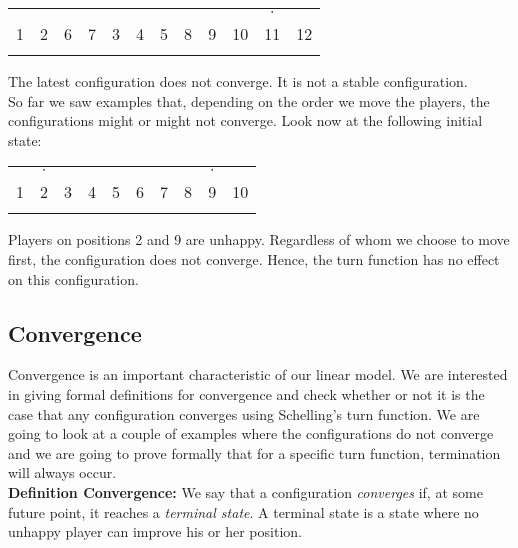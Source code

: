 \documentclass[../main.tex]{subfiles}
\begin{document}
\begin{table}[H]
\begin{center}
{\begin{tabular}{| c |c| c| c| c |c| c |c| c |c |c |c |}
\hline
 &&  & & &  & & & & &$\cdot$ & \\
1 & 2 &6 &7 &3 &4  &5 &8 &9 &10 &11 & 12 \\
\x & \x &\x &\x &\z &\z  &\z &\z &\z &\z &\x & \x \\
 \hline
\end{tabular}}
\end{center}
\end{table}

The latest configuration does not converge. It is not a stable configuration.\\

So far we saw examples that, depending on the order we move the players, the configurations might or might not converge. Look now at the following initial state:

\begin{table}[H]
\begin{center}
{\begin{tabular}{| c |c| c| c| c |c| c |c| c |c|}
\hline
 & $\cdot$ &  & & & &  & & $\cdot$ & \\
1 & 2 &3 &4 &5 &6  &7 &8 & 9 & 10 \\
\x &\x &\z &\z &\z &\z  &\z &\z &\x & \x \\
 \hline
\end{tabular}}
\end{center}
\end{table}
Players on positions 2 and 9 are unhappy. Regardless of whom we choose to move first, the configuration does not converge. Hence, the turn function has no effect on this configuration.

\subsection{Convergence }
Convergence is an important characteristic of our linear model. We are interested in giving formal definitions for convergence and check whether or not it is the case that any configuration converges using Schelling's turn function. We are going to look at a couple of examples where the configurations do not converge and we are going to prove formally that for a specific turn function, termination will always occur.\\

\textbf{Definition Convergence: } We say that a configuration \textit{converges} if, at some future point, it reaches a \textit{terminal state}. A terminal state is a state where no unhappy player can improve his or her position. \\
\end{document}
